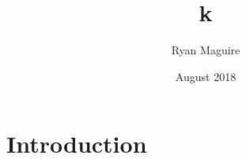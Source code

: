 \documentclass{article}
\title{k}
\author{Ryan Maguire}
\date{August 2018}
\begin{document}
\maketitle

\section{Introduction}
\end{document}
